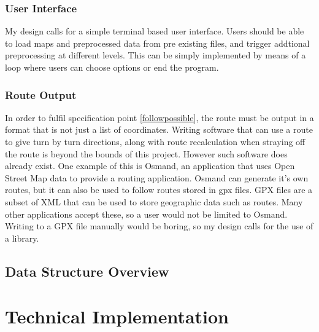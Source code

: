 \documentclass[11pt,twoside,a4paper]{article}
\begin{document}
\subsubsection{User Interface}
My design calls for a simple terminal based user interface. Users should be able to load maps and preprocessed data from pre existing files, and trigger addtional preprocessing at different levels. This can be simply implemented by means of a loop where users can choose options or end the program.
\subsubsection{Route Output}
In order to fulfil specification point \ref{followpossible}, the route must be output in a format that is not just a list of coordinates. Writing software that can use a route to give turn by turn directions, 
along with route recalculation when straying off the route is beyond the bounds of this project. However such software does already exist. One example of this is Osmand, an application that uses Open Street Map data to provide a routing application.
Osmand can generate it's own routes, but it can also be used to follow routes stored in gpx files. GPX files are a subset of XML that can be used to store geographic data such as routes. Many other applications accept these, so a user would not 
be limited to Osmand. Writing to a GPX file manually would be boring, so my design calls for the use of a library. 
\subsection{Data Structure Overview}
\newpage
\section{Technical Implementation}
\end{document}
